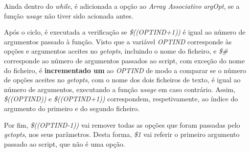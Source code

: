 \documentclass[10pt,portuguese]{article}
\begin{document}
\newline
\newline
\newline
\newline
\newline
\par Ainda dentro do \textit{while}, é adicionada a opção ao \textit{Array Associativo} \textit{argOpt}, se a função \textit{usage} não tiver sido acionada antes.
\par Após o ciclo, é executada a verificação se \textit{\$((OPTIND+1))} é igual ao número de argumentos passado à função. Visto que a variável \textit{OPTIND} corresponde às opções e argumentos aceites no \textit{getopts}, incluindo o nome do ficheiro, e \textit{\$\#} corresponde ao número de argumentos passados ao script, com exceção do nome do ficheiro, é \textbf{incrementado um} ao \textit{OPTIND} de modo a comparar se o número de opções aceites no \textit{getopts}, com o nome dos dois ficheiros de texto, é igual ao número de argumentos, executando a função \textit{usage} em caso contrário. Assim, \textit{\$((OPTIND))} e \textit{\$((OPTIND+1))} correspondem, respetivamente, ao índice do argumento do primeiro e do segundo ficheiro.
\par Por fim, \textit{\$((OPTIND-1))} vai remover todas as opções que foram passadas pelo \textit{getopts}, nos seus parâmetros. Desta forma, \textit{\$1} vai referir o primeiro argumento passado ao script, que não é uma opção.


\clearpage
\end{document}
